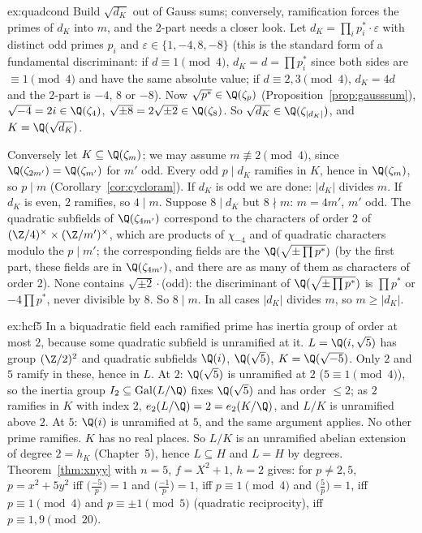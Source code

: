 \begin{solution}{ex:quadcond}
\idea Build $\sqrt{d_K}$ out of Gauss sums; conversely, ramification forces the primes of $d_K$ into $m$, and the $2$-part needs a closer look.
\writeup Let $d_K=\prod_ip_i^*\cdot\varepsilon$ with distinct odd primes $p_i$ and $\varepsilon\in\{1,-4,8,-8\}$ (this is the standard form of a fundamental
discriminant: if $d\equiv1\pmod4$, $d_K=d=\prod p_i^*$ since both sides are $\equiv1\pmod4$ and have the same absolute value; if $d\equiv2,3\pmod4$, $d_K=4d$ and
the $2$-part is $-4$, $8$ or $-8$). Now $\sqrt{p^*}\in\Q(\zeta_p)$ (Proposition~\ref{prop:gausssum}), $\sqrt{-4}=2i\in\Q(\zeta_4)$, $\sqrt{\pm8}=2\sqrt{\pm2}\in\Q(\zeta_8)$.
So $\sqrt{d_K}\in\Q(\zeta_{|d_K|})$, and $K=\Q(\sqrt{d_K})$.

Conversely let $K\subseteq\Q(\zeta_m)$; we may assume $m\not\equiv2\pmod4$, since $\Q(\zeta_{2m'})=\Q(\zeta_{m'})$ for $m'$ odd. Every odd $p\mid d_K$ ramifies in $K$,
hence in $\Q(\zeta_m)$, so $p\mid m$ (Corollary~\ref{cor:cycloram}). If $d_K$ is odd we are done: $|d_K|$ divides $m$. If $d_K$ is even, $2$ ramifies, so $4\mid m$.
Suppose $8\mid d_K$ but $8\nmid m$: $m=4m'$, $m'$ odd. The quadratic subfields of $\Q(\zeta_{4m'})$ correspond to the characters of order $2$ of
$(\Z/4)^\times\times(\Z/m')^\times$, which are products of $\chi_{-4}$ and of quadratic characters modulo the $p\mid m'$; the corresponding fields are the
$\Q(\sqrt{\pm\prod p^*})$ (by the first part, these fields are in $\Q(\zeta_{4m'})$, and there are as many of them as characters of order 2). None contains $\sqrt{\pm2}\cdot$(odd):
the discriminant of $\Q(\sqrt{\pm\prod p^*})$ is $\prod p^*$ or $-4\prod p^*$, never divisible by $8$. So $8\mid m$. In all cases $|d_K|$ divides $m$, so $m\ge|d_K|$.
\end{solution}

\begin{solution}{ex:hcf5}
\idea In a biquadratic field each ramified prime has inertia group of order at most $2$, because some quadratic subfield is unramified at it.
\writeup $L=\Q(i,\sqrt5)$ has group $(\Z/2)^2$ and quadratic subfields $\Q(i)$, $\Q(\sqrt5)$, $K=\Q(\sqrt{-5})$. Only $2$ and $5$ ramify in these, hence in $L$. At $2$:
$\Q(\sqrt5)$ is unramified at $2$ ($5\equiv1\pmod4$), so the inertia group $I_2\subseteq\operatorname{Gal}(L/\Q)$ fixes $\Q(\sqrt5)$ and has order $\le2$; as $2$
ramifies in $K$ with index $2$, $e_2(L/\Q)=2=e_2(K/\Q)$, and $L/K$ is unramified above $2$. At $5$: $\Q(i)$ is unramified at $5$, and the same argument applies.
No other prime ramifies. $K$ has no real places. So $L/K$ is an unramified abelian extension of degree $2=h_K$ (Chapter~5), hence $L\subseteq H$ and $L=H$
by degrees. Theorem~\ref{thm:xnyy} with $n=5$, $f=X^2+1$, $h=2$ gives: for $p\ne2,5$, $p=x^2+5y^2$ iff $\bigl(\frac{-5}p\bigr)=1$ and $\bigl(\frac{-1}p\bigr)=1$, iff
$p\equiv1\pmod4$ and $\bigl(\frac5p\bigr)=1$, iff $p\equiv1\pmod4$ and $p\equiv\pm1\pmod5$ (quadratic reciprocity), iff $p\equiv1,9\pmod{20}$.
\end{solution}


